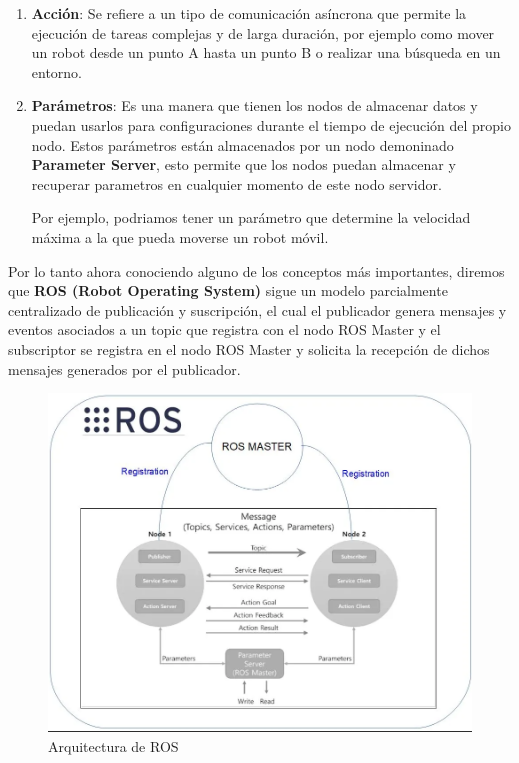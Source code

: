 \begin{enumerate}
\begin{itemize}
        \end{itemize}
    \item \textbf{Acción}: Se refiere a un tipo de comunicación asíncrona que permite la ejecución de tareas complejas y de larga duración, por ejemplo como mover un robot desde un
                           punto A hasta un punto B o realizar una búsqueda en un entorno.
    \item \textbf{Parámetros}: Es una manera que tienen los nodos de almacenar datos y puedan usarlos para configuraciones durante el tiempo de ejecución del propio nodo. Estos parámetros
    están almacenados por un nodo demoninado \textbf{Parameter Server}, esto permite que los nodos puedan almacenar y recuperar parametros en cualquier momento de este nodo servidor. 

    Por ejemplo, podriamos tener un parámetro que determine la velocidad máxima a la que pueda moverse un robot móvil. 
\end{enumerate}

Por lo tanto ahora conociendo alguno de los conceptos más importantes, diremos que \textbf{ROS (Robot Operating System)} sigue un modelo parcialmente centralizado de publicación y 
suscripción, el cual el publicador genera mensajes y eventos asociados a un topic que registra con el nodo ROS Master y el subscriptor se registra en el nodo ROS Master y solicita 
la recepción de dichos mensajes generados por el publicador.

\begin{figure} [H]
    \begin{center}
      \includegraphics[scale=0.4]{figs/Plataformas_Desarollo/arq_ros.png}
    \end{center}
    \caption{Arquitectura de ROS}
    \label{fig:ArqROS}
  \end{figure}\

